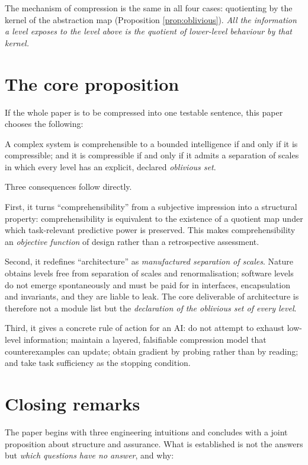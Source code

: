 The mechanism of compression is the same in all four cases: quotienting by the kernel of
the abstraction map (Proposition \ref{prop:oblivious}). \emph{All the information a level
exposes to the level above is the quotient of lower-level behaviour by that kernel.}

\section{The core proposition}

If the whole paper is to be compressed into one testable sentence, this paper chooses the
following:

\begin{principle}\label{pr:core}
A complex system is comprehensible to a bounded intelligence if and only if it is
compressible; and it is compressible if and only if it admits a separation of scales in
which every level has an explicit, declared \emph{oblivious set}.
\end{principle}

Three consequences follow directly.

First, it turns ``comprehensibility'' from a subjective impression into a structural
property: comprehensibility is equivalent to the existence of a quotient map under which
task-relevant predictive power is preserved. This makes comprehensibility an
\emph{objective function} of design rather than a retrospective assessment.

Second, it redefines ``architecture'' as \emph{manufactured separation of scales}. Nature
obtains levels free from separation of scales and renormalisation; software levels do not
emerge spontaneously and must be paid for in interfaces, encapsulation and invariants,
and they are liable to leak. The core deliverable of architecture is therefore not a
module list but the \emph{declaration of the oblivious set of every level}.

Third, it gives a concrete rule of action for an AI: do not attempt to exhaust low-level
information; maintain a layered, falsifiable compression model that counterexamples can
update; obtain gradient by probing rather than by reading; and take task sufficiency as
the stopping condition.

\section{Closing remarks}

The paper begins with three engineering intuitions and concludes with a joint proposition
about structure and assurance. What is established is not the answers but \emph{which
questions have no answer}, and why:

